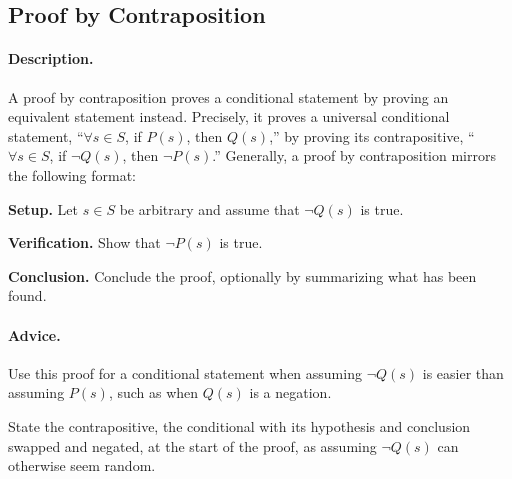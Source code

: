 \subsection{Proof by Contraposition}
\label{subsections:techniques:universal:contraposition}



\paragraph{Description.}
A proof by contraposition proves a conditional statement by proving an %
equivalent statement instead. %
Precisely, it proves a universal conditional statement, %
``$\forall s \in S$, if $P(s)$, then $Q(s)$,'' %
by proving its contrapositive, %
``$\forall s \in S$, if $\neg Q(s)$, then $\neg P(s)$.'' %
Generally, a proof by contraposition mirrors the following format:
\begin{enumerate}{
    \item \textbf{Setup.} %
        Let $s \in S$ be arbitrary and assume that $\neg Q(s)$ is true.
    \item \textbf{Verification.} %
        Show that $\neg P(s)$ is true.
    \item \textbf{Conclusion.} %
        Conclude the proof, optionally by summarizing what has been found.
}
\end{enumerate}



\paragraph{Advice.}
\begin{itemize}{
    \item Use this proof for a conditional statement when assuming %
        $\neg Q(s)$ is easier than assuming $P(s)$, %
        such as when $Q(s)$ is a negation.
    \item State the contrapositive, the conditional with its hypothesis %
        and conclusion swapped and negated, at the start of the proof, %
        as assuming $\neg Q(s)$ can otherwise seem random.
}
\end{itemize}




